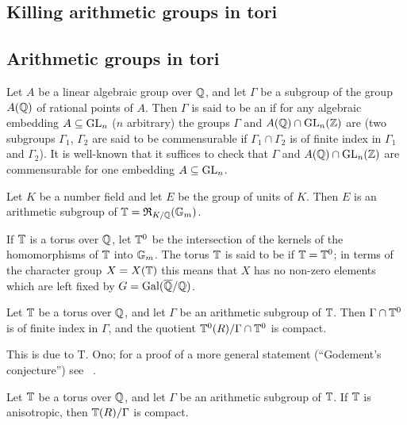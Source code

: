 \begin{subappendices}
\section{Killing arithmetic groups in tori}

\subsection{Arithmetic groups in tori}
Let $A$ be a linear algebraic group over $\mathbb{Q}$, and let $\Gamma$ be a subgroup
of the group $A(\mathbb{Q})$ of rational points of $A$. Then $\Gamma$ is said to be an
 if for any algebraic
embedding
\dpage
$A \subseteq \operatorname{GL}_n$ ($n$ arbitrary) the groups $\Gamma$ and $A(\mathbb{Q}) \cap
\operatorname{GL}_n(\mathbb{Z})$ are  (two
subgroups $\Gamma_1$, $\Gamma_2$ are said to be commensurable if $\Gamma_1 \cap
\Gamma_2$ is of finite index in $\Gamma_1$ and $\Gamma_2$). It is well-known
that it suffices to check that $\Gamma$ and $A(\mathbb{Q}) \cap \operatorname{GL}_n(\mathbb{Z})$ are
commensurable for one embedding $A \subseteq \operatorname{GL}_n$.

\begin{ex}
Let $K$ be a number field and let $E$ be the group of units of $K$.
Then $E$ is an arithmetic subgroup of $\mathbb{T} = \operatorname{\mathfrak{R}}_{K/\mathbb{Q}}(\mathbb{G}_m)$.
\end{ex}
If $\mathbb{T}$ is a torus over $\mathbb{Q}$, let $\mathbb{T}^0$ be the intersection of the kernels
of the homomorphisms of $\mathbb{T}$ into $\mathbb{G}_m$. The torus $\mathbb{T}$ is said to be
 if $\mathbb{T} = \mathbb{T}^0$; in terms of
the character group $X = X(\mathbb{T})$ this means that $X$ has no non-zero elements
which are left fixed by $G = \operatorname{Gal}(\overline{\mathbb{Q}}/\mathbb{Q})$.

\begin{thm}
Let $\mathbb{T}$ be a torus over $\mathbb{Q}$, and let $\Gamma$ be an arithmetic subgroup of
$\mathbb{T}$. Then $\Gamma \cap \mathbb{T}^0$ is of finite index in $\Gamma$, and the
quotient $\mathbb{T}^0(R)/\Gamma \cap \mathbb{T}^0$ is compact.
\end{thm}
This is due to T. Ono; for a proof of a more general statement (``Godement's
conjecture'') see \citeauthor{18}~\cite{18}.

\begin{cor}
Let $\mathbb{T}$ be a torus over $\mathbb{Q}$, and let $\Gamma$ be an arithmetic subgroup of
$\mathbb{T}$. If $\mathbb{T}$ is anisotropic, then $\mathbb{T}(R)/\Gamma$ is compact.
\end{cor}


\end{subappendices}
